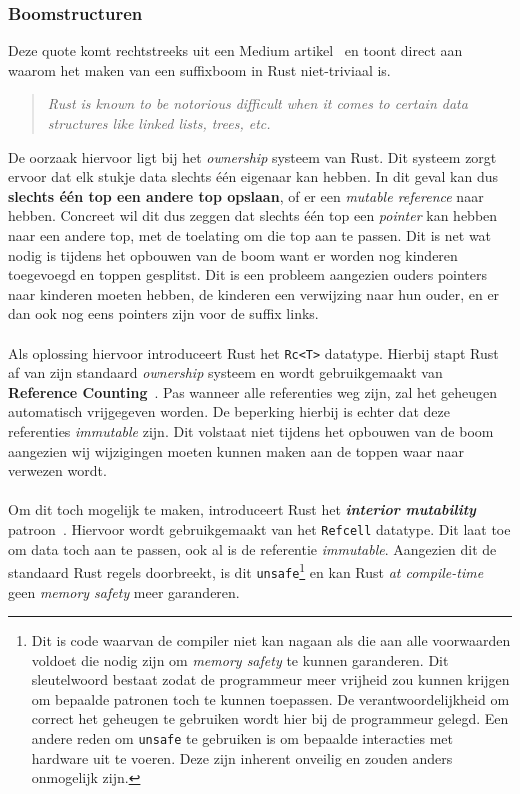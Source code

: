 \subsubsection{Boomstructuren}
Deze quote komt rechtstreeks uit een Medium artikel~\cite{rust_difficulty_quote} en toont direct aan waarom het maken van een suffixboom in Rust niet-triviaal is.
\begin{quote}
    \textit{Rust is known to be notorious difficult when it comes to certain data structures like linked lists, trees, etc.}
\end{quote}
De oorzaak hiervoor ligt bij het \textit{ownership} systeem van Rust.
Dit systeem zorgt ervoor dat elk stukje data slechts één eigenaar kan hebben.
In dit geval kan dus \textbf{slechts één top een andere top opslaan}, of er een \textit{mutable reference} naar hebben.
Concreet wil dit dus zeggen dat slechts één top een \textit{pointer} kan hebben naar een andere top, met de toelating om die top aan te passen.
Dit is net wat nodig is tijdens het opbouwen van de boom want er worden nog kinderen toegevoegd en toppen gesplitst.
Dit is een probleem aangezien ouders pointers naar kinderen moeten hebben, de kinderen een verwijzing naar hun ouder, en er dan ook nog eens pointers zijn voor de suffix links.
\\ \\
Als oplossing hiervoor introduceert Rust het \texttt{Rc<T>} datatype.
Hierbij stapt Rust af van zijn standaard \textit{ownership} systeem en wordt gebruikgemaakt van \textbf{Reference Counting}~\cite{reference_counting}.
Pas wanneer alle referenties weg zijn, zal het geheugen automatisch vrijgegeven worden.
De beperking hierbij is echter dat deze referenties \textit{immutable} zijn.
Dit volstaat niet tijdens het opbouwen van de boom aangezien wij wijzigingen moeten kunnen maken aan de toppen waar naar verwezen wordt.
\\ \\
Om dit toch mogelijk te maken, introduceert Rust het \textbf{\textit{interior mutability}} patroon~\cite{interior_mutability}.
Hiervoor wordt gebruikgemaakt van het \texttt{Refcell} datatype.
Dit laat toe om data toch aan te passen, ook al is de referentie \textit{immutable}.
Aangezien dit de standaard Rust regels doorbreekt, is dit \texttt{unsafe}\footnote{Dit is code waarvan de compiler niet kan nagaan als die aan alle voorwaarden voldoet die nodig zijn om \textit{memory safety} te kunnen garanderen. Dit sleutelwoord bestaat zodat de programmeur meer vrijheid zou kunnen krijgen om bepaalde patronen toch te kunnen toepassen. De verantwoordelijkheid om correct het geheugen te gebruiken wordt hier bij de programmeur gelegd. Een andere reden om \texttt{unsafe} te gebruiken is om bepaalde interacties met hardware uit te voeren. Deze zijn inherent onveilig en zouden anders onmogelijk zijn.} en kan Rust \textit{at compile-time} geen \textit{memory safety} meer garanderen.
